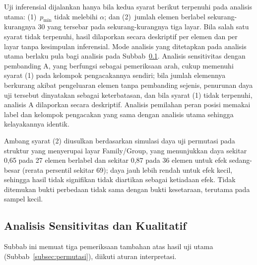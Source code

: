 Uji inferensial dijalankan hanya bila kedua syarat berikut terpenuhi pada analisis utama: (1)~$p_{\min}$ tidak melebihi $\alpha$; dan (2)~jumlah elemen berlabel sekurang-kurangnya 30 yang tersebar pada sekurang-kurangnya tiga layar. Bila salah satu syarat tidak terpenuhi, hasil dilaporkan secara deskriptif per elemen dan per layar tanpa kesimpulan inferensial. Mode analisis yang ditetapkan pada analisis utama berlaku pula bagi analisis pada Subbab~\ref{subsec:sensitivitas}. Analisis sensitivitas dengan pembanding A, yang berfungsi sebagai pemeriksaan arah, cukup memenuhi syarat (1) pada kelompok pengacakannya sendiri; bila jumlah elemennya berkurang akibat pengeluaran elemen tanpa pembanding sejenis, penurunan daya uji tersebut dinyatakan sebagai keterbatasan, dan bila syarat (1) tidak terpenuhi, analisis A dilaporkan secara deskriptif. Analisis pemilahan peran posisi memakai label dan kelompok pengacakan yang sama dengan analisis utama sehingga kelayakannya identik.

Ambang syarat (2) diusulkan berdasarkan simulasi daya uji permutasi pada struktur yang menyerupai layar Family/Group, yang menunjukkan daya sekitar 0,65 pada 27 elemen berlabel dan sekitar 0,87 pada 36 elemen untuk efek sedang-besar (rerata persentil sekitar 69); daya jauh lebih rendah untuk efek kecil, sehingga hasil tidak signifikan tidak diartikan sebagai ketiadaan efek. Tidak ditemukan bukti perbedaan tidak sama dengan bukti kesetaraan, terutama pada sampel kecil.

\subsection{Analisis Sensitivitas dan Kualitatif}
\label{subsec:sensitivitas}

Subbab ini memuat tiga pemeriksaan tambahan atas hasil uji utama (Subbab~\ref{subsec:permutasi}), diikuti aturan interpretasi.


